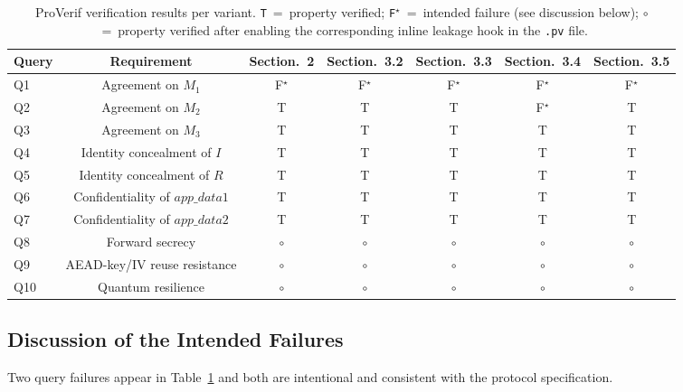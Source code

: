 \documentclass{easychair}
\newcommand{\VarSecShort}[1]{Section.~#1}
\begin{document}
\begin{table}[h]
\centering
\footnotesize
\caption{ProVerif verification results per variant.
\texttt{T}~=~property verified; \texttt{F$^\star$}~=~intended failure
(see discussion below); $\circ$~=~property verified after enabling the
corresponding inline leakage hook in the \texttt{.pv} file.}
\label{tab:proverif-results}
\begin{tabular}{lcccccc}
\toprule
\textbf{Query} & \textbf{Requirement}
& \textbf{\VarSecShort{2}} & \textbf{\VarSecShort{3.2}} & \textbf{\VarSecShort{3.3}}
& \textbf{\VarSecShort{3.4}} & \textbf{\VarSecShort{3.5}} \\
\midrule
Q1  & Agreement on $M_1$               & F$^\star$ & F$^\star$ & F$^\star$ & F$^\star$ & F$^\star$ \\
Q2  & Agreement on $M_2$               & T & T & T & F$^\star$ & T \\
Q3  & Agreement on $M_3$               & T & T & T & T & T \\
Q4  & Identity concealment of $I$       & T & T & T & T & T \\
Q5  & Identity concealment of $R$       & T & T & T & T & T \\
Q6  & Confidentiality of $\mathit{app\_data1}$ & T & T & T & T & T \\
Q7  & Confidentiality of $\mathit{app\_data2}$ & T & T & T & T & T \\
Q8  & Forward secrecy                  & $\circ$ & $\circ$ & $\circ$ & $\circ$ & $\circ$ \\
Q9  & AEAD-key/IV reuse resistance     & $\circ$ & $\circ$ & $\circ$ & $\circ$ & $\circ$ \\
Q10 & Quantum resilience               & $\circ$ & $\circ$ & $\circ$ & $\circ$ & $\circ$ \\
\bottomrule
\end{tabular}
\end{table}

\subsection{Discussion of the Intended Failures}
Two query failures appear in Table~\ref{tab:proverif-results} and both
are intentional and consistent with the protocol specification.
\end{document}
